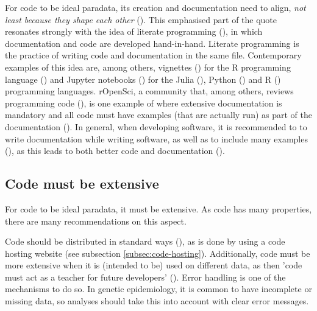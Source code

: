 For code to be ideal paradata, 
its creation and documentation need to align, 
\emph{not least because they shape each other} (\cite{huvila2022improving}).
This emphasised part of the quote resonates strongly with the idea of 
literate programming (\cite{knuth1984literate}),
in which documentation and code are developed hand-in-hand.
Literate programming is the practice of writing code and 
documentation in the same file.
Contemporary examples of this idea are, among others, 
vignettes (\cite{wickham2015r}) for the R programming language (\cite{r}) 
and Jupyter notebooks (\cite{wang2020assessing})
for the Julia (\cite{Julia-2017}), Python (\cite{van1995python}) and R (\cite{r})
programming languages.
rOpenSci, a community that, among others, reviews programming
code (\cite{ram2013ropensci,ram2018community}), is 
one example of where extensive documentation is mandatory
and all code must have examples (that are actually run)
as part of the documentation (\cite{ropensci_2021_6619350}).
In general, when developing software, 
it is recommended to 
to write documentation while writing software,
as well as to include many examples (\cite{lee2018ten}),
as this leads to both better code and documentation (\cite{reenskaug1989environment}).

\subsection{Code must be extensive}

For code to be ideal paradata, it must be extensive.
As code has many properties, there are many recommendations on this aspect.


Code should be distributed in standard ways (\cite{peng2006reproducible}),
as is done by using a code hosting website
(see subsection \ref{subsec:code-hosting}).
Additionally, code must be more extensive when it is (intended to be) 
used on different data,
as then 'code must act as a teacher for future developers' (\cite{sadowski2018modern}).
Error handling is one of the mechanisms to do so.
In genetic epidemiology, it is common to have incomplete or missing data,
so analyses should take this into account with clear error messages.

